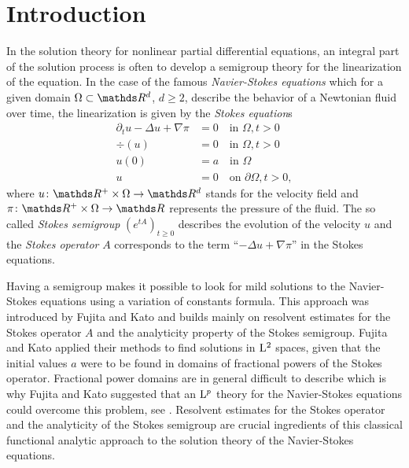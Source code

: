 \chapter*{Introduction}

In the solution theory for nonlinear partial differential equations, an integral part of the solution process is often to develop a semigroup theory for the linearization of the equation.
In the case of the famous \emph{Navier-Stokes equations} which for a given domain $\Omega \subset \R^d$, $d \geq 2$, describe the behavior of a Newtonian fluid over time, the linearization is given by the \emph{Stokes equation}s
\begin{align*}
  \partial_t u - \Delta u + \nabla \pi &= 0 \quad\text{in } \Omega, t > 0\\
  \div(u) &= 0 \quad\text{in } \Omega, t > 0 \\
  u(0) &= a \quad\text{in } \Omega \\
  u &= 0 \quad\text{on } \partial\Omega, t > 0,
\end{align*}
where $u \colon \R^+ \times \Omega \to \R^d$ stands for the velocity field and $\pi \colon \R^+ \times \Omega \to \R$ represents the pressure of the fluid.
The so called \emph{Stokes semigroup} $(e^{tA})_{t \geq 0}$ describes the evolution of the velocity $u$ and the \emph{Stokes operator} $A$ corresponds to the term ``$-\Delta u + \nabla \pi$'' in the Stokes equations. 

Having a semigroup makes it possible to look for mild solutions to the Navier-Stokes equations using a variation of constants formula.
This approach was introduced by Fujita and Kato \cite{fujitaKato,katoFujita} and builds mainly on resolvent estimates for the Stokes operator $A$ and the analyticity property of the Stokes semigroup.
Fujita and Kato applied their methods to find solutions in $\mathrm{L}^2$ spaces, given that the initial values $a$ were to be found in domains of fractional powers of the Stokes operator.
Fractional power domains are in general difficult to describe which is why Fujita and Kato suggested that an $\mathrm{L}^p$ theory for the Navier-Stokes equations could overcome this problem, see \cite[p.\@~313]{fujitaKato}.
Resolvent estimates for the Stokes operator and the analyticity of the Stokes semigroup are crucial ingredients of this classical functional analytic approach to the solution theory of the Navier-Stokes equations.

